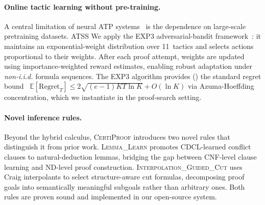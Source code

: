 \documentclass[acmtocl,review,anonymous]{acmart}
\newcommand{\CP}{\textsc{CertiProof}}
\newcommand{\ATSS}{\textsc{ATSS}}
\begin{document}
\paragraph{Online tactic learning without pre-training.}
A central limitation of neural ATP
systems~\cite{KusumoYahata2018,DeepSeekProver2024,SongYangAnandkumar2024,
AlphaProof2025,DeepSeekProverV2}
is the dependence on large-scale pretraining datasets.  \ATSS{}
We apply the EXP3 adversarial-bandit
framework~\cite{AuerCesaBianchiFreundSchapire2002}: it maintains an
exponential-weight distribution over 11~tactics and selects actions
proportional to their weights.  After each proof attempt, weights are
updated using importance-weighted reward estimates, enabling robust
adaptation under \emph{non-i.i.d.} formula sequences.
The EXP3 algorithm provides () the
standard regret bound~\cite{AuerCesaBianchiFreundSchapire2002}
$\mathbb{E}[\mathrm{Regret}_T] \le 2\sqrt{(e\!-\!1)KT\ln K} + O(\ln K)$
via Azuma-Hoeffding concentration, which we instantiate in the proof-search
setting.

\paragraph{Novel inference rules.}
Beyond the hybrid calculus, \CP{} introduces two novel rules that
distinguish it from prior work.  \textsc{Lemma\_Learn} promotes
CDCL-learned conflict clauses to natural-deduction lemmas, bridging
the gap between CNF-level clause learning and ND-level proof
construction.  \textsc{Interpolation\_Guided\_Cut} uses Craig
interpolants to select structure-aware cut formulas, decomposing
proof goals into semantically meaningful subgoals rather than
arbitrary ones.  Both rules are proven sound and implemented in
our open-source system.
\end{document}

